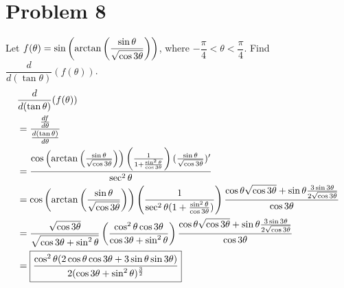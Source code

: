 \documentclass[12pt]{article}
\newcommand*{\paren}[1]{\ensuremath\left(#1\right)}
\newcommand{\problem}[1]{\section{Problem #1}}
\begin{document}
\problem{8}
Let $f(\theta )=\sin \paren{\arctan \paren{\dfrac{\sin \theta}{\sqrt{\cos 3\theta}}}}$, where $-\dfrac{\pi}{4}<\theta < \dfrac{\pi}{4}$. Find $\dfrac{d}{d(\tan \theta)}(f(\theta ))$.
\begin{align*}
    &\dfrac{d}{d(\tan \theta)}(f(\theta ))\\
    &= \frac{\frac{df}{d\theta}}{\frac{d(\tan \theta)}{d\theta}}\\
    &= \frac{\cos \paren{\arctan \paren{\frac{\sin \theta}{\sqrt{\cos 3\theta}}}} \paren{\frac{1}{1+ \frac{\sin ^2\theta}{\cos 3\theta}}} (\frac{\sin \theta}{\sqrt{\cos 3\theta}})'}{\sec ^2\theta}\\
    &=\cos \paren{\arctan \paren{\frac{\sin \theta}{\sqrt{\cos 3\theta}}}} \paren{\frac{1}{\sec^2 \theta(1+ \frac{\sin ^2\theta}{\cos 3\theta})}} \frac{\cos \theta \sqrt{\cos 3\theta}+\sin \theta \frac{3\sin 3\theta}{2\sqrt{\cos 3\theta}}}{\cos 3\theta}\\
    &=\frac{\sqrt{\cos 3\theta}}{\sqrt{\cos 3\theta + \sin^2 \theta}}\paren{\frac{\cos^2 \theta \cos 3\theta}{\cos 3\theta+ \sin ^2\theta}} \frac{\cos \theta \sqrt{\cos 3\theta}+\sin \theta \frac{3\sin 3\theta}{2\sqrt{\cos 3\theta}}}{\cos 3\theta}\\
    &= \boxed{\frac{\cos^2 \theta (2\cos\theta \cos 3 \theta + 3\sin \theta \sin 3 \theta)}{2(\cos 3\theta + \sin^2 \theta)^\frac{3}{2}}}
\end{align*}
\end{document}
